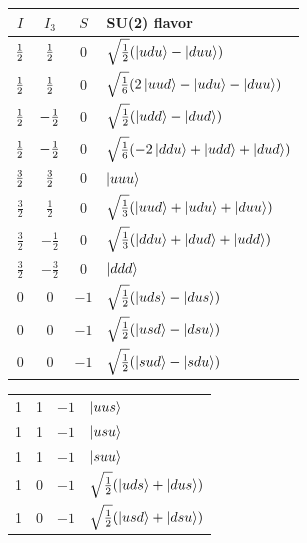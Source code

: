    \begin{table}
        \centering
        \begin{minipage}{.49\linewidth}
            \centering
            \begin{tabular}{|c|c|c|l|}
                \hline
                $I$ & $I_3$ & $S$ & SU(2) flavor \\
                \hline
                $\frac{1}{2}$ & $\frac{1}{2}$ & 0 & $\sqrt{\frac{1}{2}}(\ket{udu} - \ket{duu})$ \\
                $\frac{1}{2}$ & $\frac{1}{2}$ & 0 & $\sqrt{\frac{1}{6}}(2\ket{uud} - \ket{udu} - \ket{duu})$ \\
                $\frac{1}{2}$ & $-\frac{1}{2}$ & 0 & $\sqrt{\frac{1}{2}}(\ket{udd} - \ket{dud})$ \\
                $\frac{1}{2}$ & $-\frac{1}{2}$ & 0 & $\sqrt{\frac{1}{6}}(-2\ket{ddu} + \ket{udd} + \ket{dud})$ \\
                \hline
                $\frac{3}{2}$ & $\frac{3}{2}$ & 0 & $\ket{uuu}$ \\
                $\frac{3}{2}$ & $\frac{1}{2}$  & 0 &
                $\sqrt{\frac{1}{3}}(\ket{uud}+\ket{udu}+\ket{duu})$ \\
                $\frac{3}{2}$ & $-\frac{1}{2}$ & 0 &
     $\sqrt{\frac{1}{3}}(\ket{ddu}+\ket{dud}+\ket{udd})$ \\
 $\frac{3}{2}$ & $-\frac{3}{2}$ & 0 &
     $\ket{ddd}$ \\ \hline
     0 & 0 & $-1$ & $\sqrt{\frac{1}{2}}(\ket{uds}-\ket{dus})$ \\ 
     0 & 0 & $-1$ & $\sqrt{\frac{1}{2}}(\ket{usd}-\ket{dsu})$ \\ 
     0 & 0 & $-1$ & $\sqrt{\frac{1}{2}}(\ket{sud}-\ket{sdu})$ \\
     \hline
            \end{tabular}
        \end{minipage}
        \begin{minipage}{.49\linewidth}
            \centering
            \vspace{2in}
            \begin{tabular}{|c|c|c|l|}
                \hline
                1 & 1 & $-1$ & $\ket{uus}$\\
 1 & 1 & $-1$ & $\ket{usu}$\\
 1 & 1 & $-1$ & $\ket{suu}$\\
 1 & 0 & $-1$ & $\sqrt{\frac{1}{2}}(\ket{uds}+\ket{dus})$\\
 1 & 0 & $-1$ & $\sqrt{\frac{1}{2}}(\ket{usd}+\ket{dsu})$\\

\end{tabular}
\end{minipage}
\end{table}
